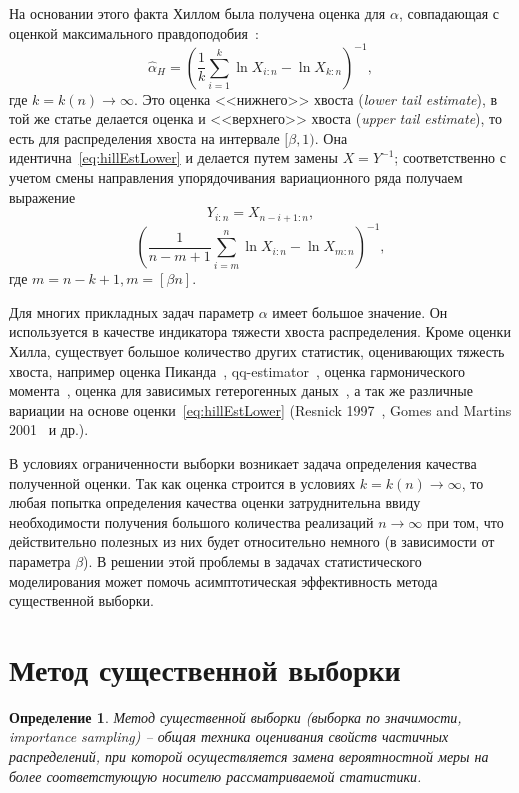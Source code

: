 \documentclass[12pt, specialist, subf, substylefile = spbu.rtx]{disser}
\newtheorem{definition}{Определение}
\begin{document}
На основании этого факта Хиллом была получена оценка для $\alpha$, совпадающая с оценкой максимального правдоподобия~\cite{Hill}:
\begin{equation}\label{eq:hillEstLower}
\hat{\alpha}_H=\left(\frac{1}{k} \sum\limits_{i=1}^k \ln X_{i:n}-\ln X_{k:n} \right)^{-1},
\end{equation}
где $k=k(n) \to \infty$. Это оценка <<нижнего>> хвоста (\textit{lower tail estimate}), в той же статье делается оценка и <<верхнего>> хвоста (\textit{upper tail estimate}), то есть для распределения хвоста на интервале $[\beta, 1)$. Она идентична~\eqref{eq:hillEstLower} и делается путем замены $X=Y^{-1}$; соответственно с учетом смены направления упорядочивания вариационного ряда получаем выражение
$$
Y_{i:n}=X_{n-i+1:n},
$$
\begin{equation}\label{eq:hillEst}
\left(\frac{1}{n-m+1} \sum\limits_{i=m}^n \ln X_{i:n}-\ln X_{m:n} \right)^{-1},
\end{equation}
где $m=n-k+1, m=[\beta n]$.

Для многих прикладных задач параметр $\alpha$ имеет большое значение. 
Он используется в качестве индикатора тяжести хвоста распределения. Кроме оценки Хилла, существует большое количество других статистик, оценивающих тяжесть хвоста, например оценка Пиканда~\cite{iii1975}, qq-estimator~\cite{kratz1995}, оценка гармонического момента~\cite{henry2009}, оценка для зависимых гетерогенных даных~\cite{hill2010}, а так же различные вариации на основе оценки~\eqref{eq:hillEstLower} (Resnick 1997~\cite{resnick1998}, Gomes and Martins 2001~\cite{Gomes2001} и др.).

В условиях ограниченности выборки возникает задача определения качества полученной оценки. Так как оценка строится в условиях $k=k(n) \to \infty$, то любая попытка определения качества оценки затруднительна ввиду необходимости получения большого количества реализаций $n \to \infty$ при том, что действительно полезных из них будет относительно немного (в зависимости от параметра $\beta$). В решении этой проблемы в задачах статистического моделирования может помочь асимптотическая эффективность метода существенной выборки.

\section{Метод существенной выборки}

\begin{definition}
Метод существенной выборки (выборка по значимости, importance sampling) -- общая техника оценивания свойств частичных распределений, при которой осуществляется замена вероятностной меры на более соответстующую носителю рассматриваемой статистики.
\end{definition}
\end{document}
